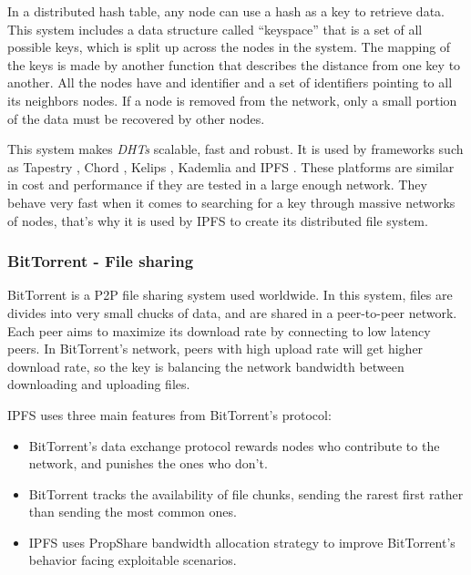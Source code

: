In a distributed hash table, any node can use a hash as a key to retrieve data.
This system includes a data structure called ``keyspace'' that is a set of all
possible keys, which is split up across the nodes in the system. The mapping of
the keys is made by another function that describes the distance from one key to
another. All the nodes have and identifier and a set of identifiers pointing to
all its neighbors nodes. If a node is removed from the network, only a small
portion of the data must be recovered by other
nodes\cite{kaluszka2010distributed}.

This system makes \emph{DHTs} scalable, fast and robust. It is used by
frameworks such as Tapestry \cite{zhao2004tapestry}, Chord
\cite{stoica2001chord}, Kelips \cite{gupta2003kelips}, Kademlia
\cite{maymounkov2002kademlia} and IPFS \cite{benet2014ipfs}. These platforms are
similar in cost and performance if they are tested in a large enough network.
They behave very fast when it comes to searching for a key through massive
networks of nodes\cite{li2004comparing}, that's why it is used by IPFS to create
its distributed file system.

\subsubsection{BitTorrent - File sharing}
\label{tech:sec:ipfs:bt}
BitTorrent \cite{cohen2003incentives} is a P2P file sharing system used
worldwide. In this system, files are divides into very small chucks of data, and
are shared in a peer-to-peer network. Each peer aims to maximize its download
rate by connecting to low latency peers. In BitTorrent's network, peers with
high upload rate will get higher download rate, so the key is balancing the
network bandwidth between downloading and uploading
files\cite{pouwelse2005bittorrent}.

IPFS uses three main features from BitTorrent's protocol\cite{benet2014ipfs}:
\begin{itemize}
\item BitTorrent's data exchange protocol rewards nodes who contribute to the
  network, and punishes the ones who don't.
\item BitTorrent tracks the availability of file chunks, sending the rarest
  first rather than sending the most common ones.
\item IPFS uses PropShare\cite{levin2008bittorrent} bandwidth allocation
  strategy to improve BitTorrent's behavior facing exploitable scenarios.
\end{itemize}

